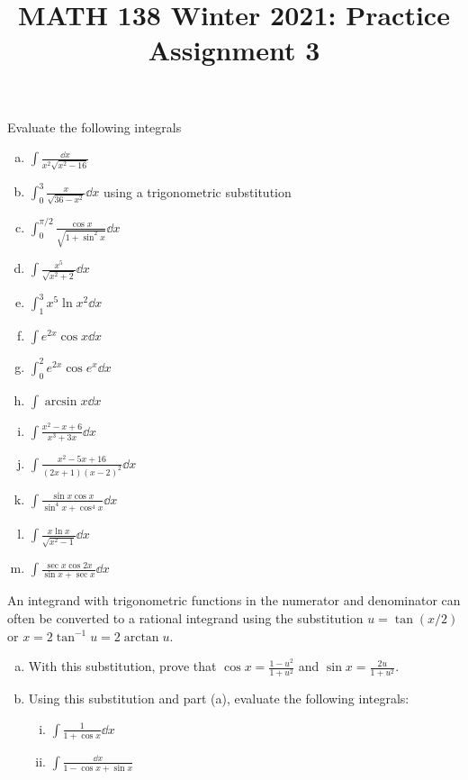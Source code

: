 \documentclass{agony}
\title{MATH 138 Winter 2021: Practice Assignment 3}
\begin{document}
\begin{prob}
  Evaluate the following integrals
\end{prob}
\begin{enumerate}[(a)]
  \item $\displaystyle\int \frac{\dd x}{x^2\sqrt{x^2 - 16}}$
  \item $\displaystyle\int_0^3 \frac{x}{\sqrt{36 - x^2}} \dd{x}$
        using a trigonometric substitution
  \item $\displaystyle\int_0^{\pi/2} \frac{\cos x}{\sqrt{1 + \sin^2 x}} \dd{x}$
  \item $\displaystyle\int \frac{x^5}{\sqrt{x^2 + 2}} \dd{x}$
  \item $\displaystyle\int_1^3 x^5 \ln x^2 \dd{x}$
  \item $\displaystyle\int e^{2x} \cos x \dd{x}$
  \item $\displaystyle\int_0^2 e^{2x} \cos e^x \dd{x}$
  \item $\displaystyle\int \arcsin x \dd{x}$
  \item $\displaystyle\int \frac{x^2 - x + 6}{x^3 + 3x} \dd{x}$
  \item $\displaystyle\int \frac{x^2 - 5x + 16}{(2x+1)(x-2)^2} \dd{x}$
  \item $\displaystyle\int \frac{\sin x \cos x}{\sin^4 x + \cos^4 x} \dd{x}$
  \item $\displaystyle\int \frac{x \ln x}{\sqrt{x^2 - 1}} \dd{x}$
  \item $\displaystyle\int \frac{\sec x \cos 2x}{\sin x + \sec x} \dd{x}$
\end{enumerate}

\begin{prob}
  An integrand with trigonometric functions in the numerator and denominator
  can often be converted to a rational integrand using the substitution
  $u = \tan(x/2)$ or $x = 2\tan^{-1} u = 2 \arctan u$.
\end{prob}
\begin{enumerate}[(a)]
  \item With this substitution,
        prove that $\cos x = \frac{1-u^2}{1+u^2}$ and $\sin x = \frac{2u}{1+u^2}$.
  \item Using this substitution and part (a), evaluate the following integrals:
        \begin{enumerate}[i.]
          \item $\displaystyle\int \frac{1}{1+\cos x} \dd{x}$
          \item $\displaystyle\int \frac{\dd{x}}{1 - \cos x + \sin x}$
        \end{enumerate}
\end{enumerate}
\end{document}
